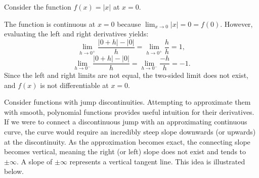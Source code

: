 \documentclass[../calculus.tex]{subfiles}
\begin{document}
\begin{example}
    Consider the function $f(x) = |x|$ at $x=0$.
    \begin{center}
    \end{center}
    
    The function is continuous at $x=0$ because $\lim_{x\to 0} |x| = 0 = f(0)$. However, evaluating the left and right derivatives yields:
    \[\lim_{h\to 0^+} \frac{|0+h|-|0|}{h} = \lim_{h\to 0^+} \frac{h}{h} = 1,\]
    \[\lim_{h\to 0^-} \frac{|0+h|-|0|}{h} = \lim_{h\to 0^-} \frac{-h}{h} = -1.\]
    Since the left and right limits are not equal, the two-sided limit does not exist, and $f(x)$ is not differentiable at $x=0$.
\end{example}

Consider functions with jump discontinuities. Attempting to approximate them with smooth, polynomial functions provides useful intuition for their derivatives. If we were to connect a discontinuous jump with an approximating continuous curve, the curve would require an incredibly steep slope downwards (or upwards) at the discontinuity. As the approximation becomes exact, the connecting slope becomes vertical, meaning the right (or left) slope does not exist and tends to $\pm\infty$. A slope of $\pm\infty$ represents a vertical tangent line. This idea is illustrated below.
\end{document}
